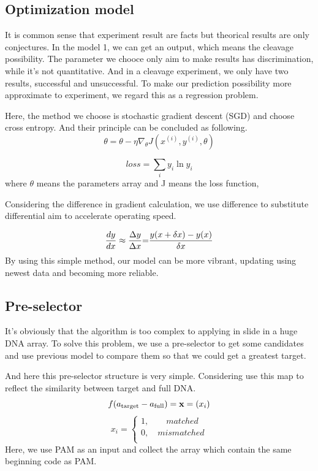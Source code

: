 \documentclass[a4paper,10pt]{article}
\begin{document}
	\subsection{Optimization model}
	It is common sense that experiment result are facts but theorical results are only conjectures. In the model 1, we can get an output, which means the cleavage possibility. The parameter we chooce only aim to make results has discrimination, while it’s not quantitative. And in a cleavage experiment, we only have two results, successful and unsuccessful. To make our prediction possibility more approximate to experiment, we regard this as a regression problem.\par
	Here, the method we choose is stochastic gradient descent (SGD) and choose cross entropy. And their principle can be concluded as following.
	\begin{equation}
	\theta  = \theta  - \eta {\nabla _\theta }J({x^{(i)}},{y^{(i)}},\theta )
	\end{equation}
	
	\begin{equation}
	loss = \sum\limits_i {{y_i}\ln {y_i}}
	\end{equation}
	where $\theta$ means the parameters array and J means the loss function, \par
	Considering the difference in gradient calculation, we use difference to substitute differential aim to accelerate operating speed.\par
	\begin{equation}
	\frac{{dy}}{{dx}} \approx \frac{{\Delta y}}{{\Delta x}}{\rm{ = }}\frac{{y(x + \delta x) - y(x)}}{{\delta x}}
	\end{equation}
	By using this simple method, our model can be more vibrant, updating using newest data and becoming more reliable.
	\subsection{Pre-selector}
	It’s obviously that the algorithm is too complex to applying in slide in a huge DNA array. To solve this problem, we use a pre-selector to get some candidates and use previous model to compare them so that we could get a greatest target.\par
	And here this pre-selector structure is very simple.
	Considering use this map to reflect the similarity between target and full DNA.
	\begin{equation}
	f({a_{{\rm{target}}}} - {a_{{\rm{full}}}}) = {\bf{x}} = ({x_i})
	\end{equation}
	\begin{equation}{x_i} = \left\{ {\begin{array}{*{20}{c}}
		{1,\quad \quad matched}  \\
		{0,\quad mismatched}  \\
		\end{array}} \right.
	\end{equation}
	Here, we use PAM as an input and collect the array which contain the same beginning code as PAM.
\end{document}
